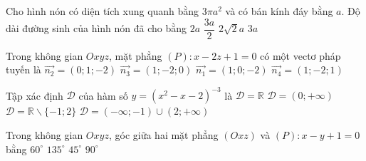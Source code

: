 \begin{ex}%
	Cho hình nón có diện tích xung quanh bằng $3 \pi a^2$ và có bán kính đáy bằng $a$. Độ dài đường sinh của hình nón đã cho bằng
	\choice
	{$2a$}
	{$\dfrac{3a}{2}$}
	{$2\sqrt{2}a$}
	{\True $3a$}
\end{ex}

\begin{ex}%
	Trong không gian $Oxyz$, mặt phẳng $(P)\colon x-2z+1=0$ có một vectơ pháp tuyến là
	\choice
	{$\overrightarrow{n_2}=(0;1;-2)$}
	{$\overrightarrow{n_3}=(1;-2;0)$}
	{\True $\overrightarrow{n_1}=(1;0;-2)$}
	{$\overrightarrow{n_4}=(1;-2;1)$}
\end{ex}

\begin{ex}%
	Tập xác định $\mathscr{D}$ của hàm số $y=\left(x^2-x-2\right)^{-3}$ là
	\choice
	{$\mathscr{D}=\mathbb{R}$}
	{$\mathscr{D}=(0;+\infty)$}
	{\True $\mathscr{D}=\mathbb{R}\backslash\{-1;2\}$}
	{$\mathscr{D}=(-\infty;-1) \cup(2 ;+\infty)$}
\end{ex}

\begin{ex}%
	Trong không gian $Oxyz$, góc giữa hai mặt phẳng $(Oxz)$ và $(P)\colon x-y+1=0$ bằng
	\choice
	{$60^{\circ}$}
	{$135^{\circ}$}
	{\True $45^{\circ}$}
	{$90^{\circ}$}
\end{ex}

